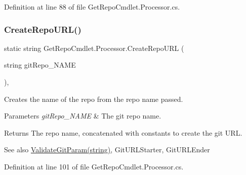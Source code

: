 Definition at line 88 of file Get\+Repo\+Cmdlet.\+Processor.\+cs.

\mbox{\label{class_get_repo_cmdlet_1_1_processor_ae8b0a813f91987946bfc8e218b3ab396}} 
\subsubsection{\texorpdfstring{Create\+Repo\+U\+R\+L()}{CreateRepoURL()}}
{\footnotesize\ttfamily static string Get\+Repo\+Cmdlet.\+Processor.\+Create\+Repo\+U\+RL (\begin{DoxyParamCaption}\item[{string}]{git\+Repo\+\_\+\+N\+A\+ME }\end{DoxyParamCaption})\hspace{0.3cm}{\ttfamily [static]}, {\ttfamily [package]}}



Creates the name of the repo from the repo name passed. 


\begin{DoxyParams}{Parameters}
{\em git\+Repo\+\_\+\+N\+A\+ME} & The git repo name.\\
\hline
\end{DoxyParams}
\begin{DoxyReturn}{Returns}
The repo name, concatenated with constants to create the git U\+RL.
\end{DoxyReturn}
\begin{DoxySeeAlso}{See also}
\mbox{\hyperlink{class_get_repo_cmdlet_1_1_processor_a0fba012ba15720a0fcd419c44b757c5b}{Validate\+Git\+Param(string)}}, Git\+U\+R\+L\+Starter, Git\+U\+R\+L\+Ender


\end{DoxySeeAlso}


Definition at line 101 of file Get\+Repo\+Cmdlet.\+Processor.\+cs.

\mbox{\label{class_get_repo_cmdlet_1_1_processor_ae5f7bb67f8595174379a2cb144ae22c3}} 
